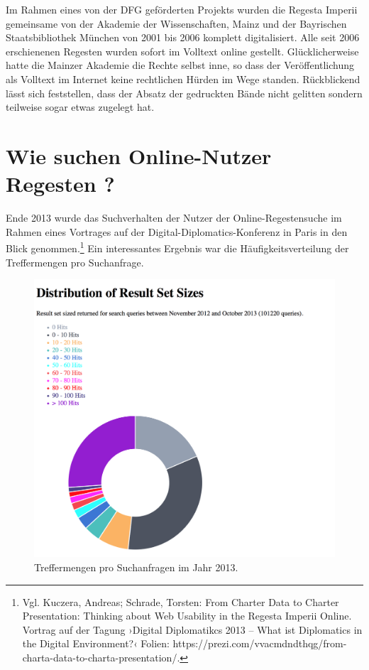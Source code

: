 \documentclass[ngerman,]{scrreprt}
\begin{document}
Im Rahmen eines von der DFG geförderten Projekts wurden die Regesta Imperii gemeinsame von der Akademie der Wissenschaften, Mainz und der Bayrischen Staatsbibliothek München von 2001 bis 2006 komplett digitalisiert. Alle seit 2006 erschienenen Regesten wurden sofort im Volltext online gestellt. Glücklicherweise hatte die Mainzer Akademie die Rechte selbst inne, so dass der Veröffentlichung als Volltext im Internet keine rechtlichen Hürden im Wege standen. Rückblickend lässt sich feststellen, dass der Absatz der gedruckten Bände nicht gelitten sondern teilweise sogar etwas zugelegt hat.

\section{Wie suchen Online-Nutzer Regesten ?}\label{wie-suchen-online-nutzer-regesten}

Ende 2013 wurde das Suchverhalten der Nutzer der Online-Regestensuche im Rahmen eines Vortrages auf der Digital-Diplomatics-Konferenz in Paris in den Blick genommen.\footnote{Vgl. Kuczera, Andreas; Schrade, Torsten: From Charter Data to Charter Presentation: Thinking about Web Usability in the Regesta Imperii Online. Vortrag auf der Tagung ›Digital Diplomatikcs 2013 -- What ist Diplomatics in the Digital Environment?‹ Folien: https://prezi.com/vvacmdndthqg/from-charta-data-to-charta-presentation/.} Ein interessantes Ergebnis war die Häufigkeitsverteilung der Treffermengen pro Suchanfrage.

\begin{figure}
\centering
\includegraphics{Bilder/2012-Nutzungsformen_der_RI.png}
\caption{Treffermengen pro Suchanfragen im Jahr 2013.}
\end{figure}
\end{document}

